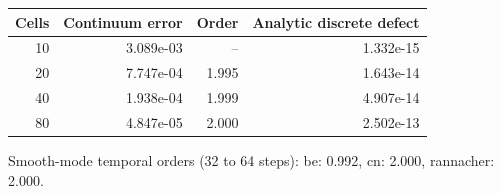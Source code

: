 \begin{center}\small
\begin{tabular}{rrrr}\toprule
Cells & Continuum error & Order & Analytic discrete defect\\\midrule
10 & 3.089e-03 & -- & 1.332e-15\\
20 & 7.747e-04 & 1.995 & 1.643e-14\\
40 & 1.938e-04 & 1.999 & 4.907e-14\\
80 & 4.847e-05 & 2.000 & 2.502e-13\\
\bottomrule\end{tabular}
\par Smooth-mode temporal orders (32 to 64 steps):
be: 0.992, cn: 2.000, rannacher: 2.000.
\end{center}
